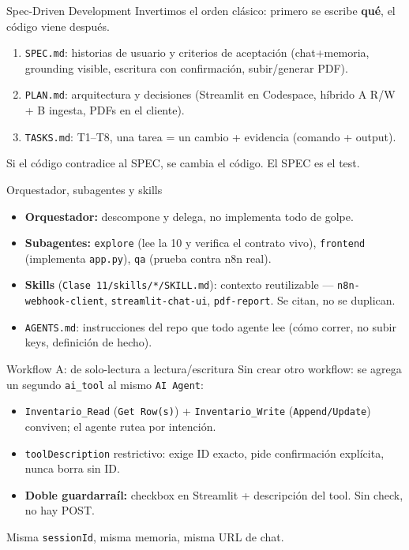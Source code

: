 \documentclass[aspectratio=169,11pt]{beamer}
\begin{document}
\begin{frame}[fragile]{Spec-Driven Development}
  Invertimos el orden clásico: primero se escribe \textbf{qué}, el código viene después.
  \begin{enumerate}
    \item \texttt{SPEC.md}: historias de usuario y criterios de aceptación (chat+memoria, grounding visible, escritura con confirmación, subir/generar PDF).
    \item \texttt{PLAN.md}: arquitectura y decisiones (Streamlit en Codespace, híbrido A R/W + B ingesta, PDFs en el cliente).
    \item \texttt{TASKS.md}: T1--T8, una tarea = un cambio + evidencia (comando + output).
  \end{enumerate}
  Si el código contradice al SPEC, se cambia el código. El SPEC es el test.
\end{frame}

\begin{frame}{Orquestador, subagentes y skills}
  \begin{itemize}
    \item \textbf{Orquestador:} descompone y delega, no implementa todo de golpe.
    \item \textbf{Subagentes:} \texttt{explore} (lee la 10 y verifica el contrato vivo), \texttt{frontend} (implementa \texttt{app.py}), \texttt{qa} (prueba contra n8n real).
    \item \textbf{Skills} (\texttt{Clase 11/skills/*/SKILL.md}): contexto reutilizable --- \texttt{n8n-webhook-client}, \texttt{streamlit-chat-ui}, \texttt{pdf-report}. Se citan, no se duplican.
    \item \texttt{AGENTS.md}: instrucciones del repo que todo agente lee (cómo correr, no subir keys, definición de hecho).
  \end{itemize}
\end{frame}

\begin{frame}{Workflow A: de solo-lectura a lectura/escritura}
  Sin crear otro workflow: se agrega un segundo \texttt{ai\_tool} al mismo \texttt{AI Agent}:
  \begin{itemize}
    \item \texttt{Inventario\_Read} (\texttt{Get Row(s)}) + \texttt{Inventario\_Write} (\texttt{Append/Update}) conviven; el agente rutea por intención.
    \item \texttt{toolDescription} restrictivo: exige ID exacto, pide confirmación explícita, nunca borra sin ID.
    \item \textbf{Doble guardarraíl:} checkbox en Streamlit + descripción del tool. Sin check, no hay POST.
  \end{itemize}
  Misma \texttt{sessionId}, misma memoria, misma URL de chat.
\end{frame}
\end{document}

